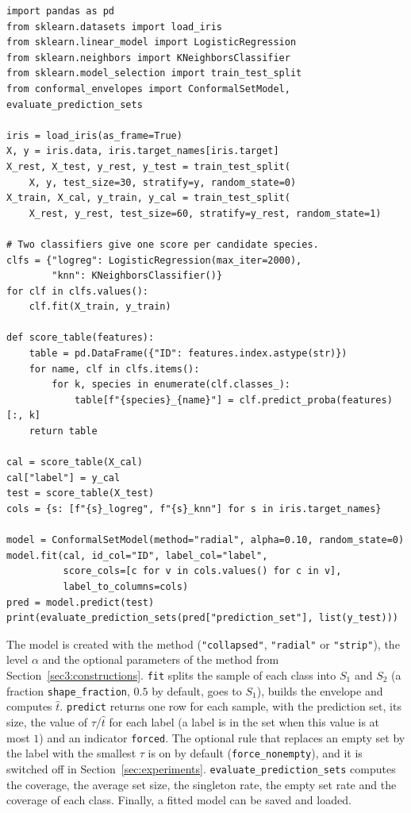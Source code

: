 {\footnotesize
\begin{verbatim}
import pandas as pd
from sklearn.datasets import load_iris
from sklearn.linear_model import LogisticRegression
from sklearn.neighbors import KNeighborsClassifier
from sklearn.model_selection import train_test_split
from conformal_envelopes import ConformalSetModel, evaluate_prediction_sets

iris = load_iris(as_frame=True)
X, y = iris.data, iris.target_names[iris.target]
X_rest, X_test, y_rest, y_test = train_test_split(
    X, y, test_size=30, stratify=y, random_state=0)
X_train, X_cal, y_train, y_cal = train_test_split(
    X_rest, y_rest, test_size=60, stratify=y_rest, random_state=1)

# Two classifiers give one score per candidate species.
clfs = {"logreg": LogisticRegression(max_iter=2000),
        "knn": KNeighborsClassifier()}
for clf in clfs.values():
    clf.fit(X_train, y_train)

def score_table(features):
    table = pd.DataFrame({"ID": features.index.astype(str)})
    for name, clf in clfs.items():
        for k, species in enumerate(clf.classes_):
            table[f"{species}_{name}"] = clf.predict_proba(features)[:, k]
    return table

cal = score_table(X_cal)
cal["label"] = y_cal
test = score_table(X_test)
cols = {s: [f"{s}_logreg", f"{s}_knn"] for s in iris.target_names}

model = ConformalSetModel(method="radial", alpha=0.10, random_state=0)
model.fit(cal, id_col="ID", label_col="label",
          score_cols=[c for v in cols.values() for c in v],
          label_to_columns=cols)
pred = model.predict(test)
print(evaluate_prediction_sets(pred["prediction_set"], list(y_test)))
\end{verbatim}
}


The model is created with the method (\texttt{"collapsed"}, \texttt{"radial"} or \texttt{"strip"}), the level $\alpha$ and 
the optional parameters of the method from Section~\ref{sec3:constructions}. \texttt{fit} splits the sample of each class 
into $S_1$ and $S_2$ (a fraction \texttt{shape\_fraction}, $0.5$ by default, goes to $S_1$), builds the envelope and 
computes $\hat t$. \texttt{predict} returns one row for each sample, with the prediction set, its size, the value of $\tau/\hat t$
for each label (a label is in the set when this value is at most $1$) and an indicator \texttt{forced}. The optional rule that 
replaces an empty set by the label with the smallest $\tau$ is on by default (\texttt{force\_nonempty}), and it is switched off 
in Section~\ref{sec:experiments}. \texttt{evaluate\_prediction\_sets} computes the coverage, the average set size, the singleton 
rate, the empty set rate and the coverage of each class. Finally, a fitted model can be saved and loaded.

